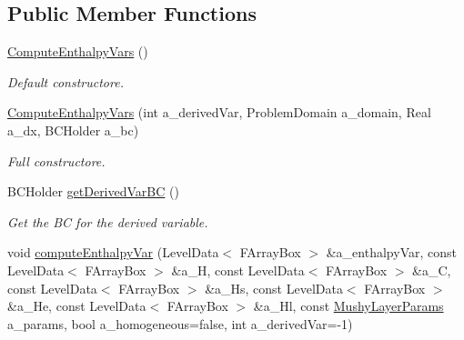\subsection*{Public Member Functions}
\begin{DoxyCompactItemize}
\item 
\hypertarget{class_compute_enthalpy_vars_a4b3a85e6a0b2567d4135adf1fd820b56}{\hyperlink{class_compute_enthalpy_vars_a4b3a85e6a0b2567d4135adf1fd820b56}{Compute\-Enthalpy\-Vars} ()}\label{class_compute_enthalpy_vars_a4b3a85e6a0b2567d4135adf1fd820b56}

\begin{DoxyCompactList}\small\item\em Default constructore. \end{DoxyCompactList}\item 
\hypertarget{class_compute_enthalpy_vars_a4ced20d0217de6d46fe17007ee492b5e}{\hyperlink{class_compute_enthalpy_vars_a4ced20d0217de6d46fe17007ee492b5e}{Compute\-Enthalpy\-Vars} (int a\-\_\-derived\-Var, Problem\-Domain a\-\_\-domain, Real a\-\_\-dx, B\-C\-Holder a\-\_\-bc)}\label{class_compute_enthalpy_vars_a4ced20d0217de6d46fe17007ee492b5e}

\begin{DoxyCompactList}\small\item\em Full constructore. \end{DoxyCompactList}\item 
\hypertarget{class_compute_enthalpy_vars_ac85aa8b68c2b857fa2d05cfbc4bacb5d}{B\-C\-Holder \hyperlink{class_compute_enthalpy_vars_ac85aa8b68c2b857fa2d05cfbc4bacb5d}{get\-Derived\-Var\-B\-C} ()}\label{class_compute_enthalpy_vars_ac85aa8b68c2b857fa2d05cfbc4bacb5d}

\begin{DoxyCompactList}\small\item\em Get the B\-C for the derived variable. \end{DoxyCompactList}\item 
\hypertarget{class_compute_enthalpy_vars_a938bd735fc7a6be6ffc5453addff13fd}{void \hyperlink{class_compute_enthalpy_vars_a938bd735fc7a6be6ffc5453addff13fd}{compute\-Enthalpy\-Var} (Level\-Data$<$ F\-Array\-Box $>$ \&a\-\_\-enthalpy\-Var, const Level\-Data$<$ F\-Array\-Box $>$ \&a\-\_\-\-H, const Level\-Data$<$ F\-Array\-Box $>$ \&a\-\_\-\-C, const Level\-Data$<$ F\-Array\-Box $>$ \&a\-\_\-\-Hs, const Level\-Data$<$ F\-Array\-Box $>$ \&a\-\_\-\-He, const Level\-Data$<$ F\-Array\-Box $>$ \&a\-\_\-\-Hl, const \hyperlink{class_mushy_layer_params}{Mushy\-Layer\-Params} a\-\_\-params, bool a\-\_\-homogeneous=false, int a\-\_\-derived\-Var=-\/1)}\label{class_compute_enthalpy_vars_a938bd735fc7a6be6ffc5453addff13fd}


\end{DoxyCompactItemize}
